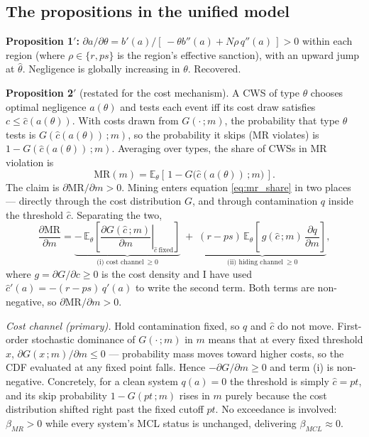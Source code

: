 \documentclass{article}
\begin{document}
\subsection{The propositions in the unified model}

\textbf{Proposition 1$'$:} $\partial a/\partial\theta = b'(a) / [\,-\theta b''(a) + N\rho\, q''(a)\,] > 0$ within each region (where $\rho \in \{r, ps\}$ is the region's effective sanction), with an upward jump at $\hat{\theta}$. Negligence is globally increasing in $\theta$. Recovered.

\textbf{Proposition 2$'$} (restated for the cost mechanism). A CWS of type $\theta$ chooses optimal negligence $a(\theta)$ and tests each event iff its cost draw satisfies $c \le \hat{c}(a(\theta))$. With costs drawn from $G(\cdot\,;m)$, the probability that type $\theta$ tests is $G(\hat{c}(a(\theta))\,;m)$, so the probability it skips (MR violates) is $1 - G(\hat{c}(a(\theta))\,;m)$. Averaging over types, the share of CWSs in MR violation is
\begin{equation}\label{eq:mr_share}
\text{MR}(m) = \mathbb{E}_\theta\!\left[\, 1 - G\!\big(\hat{c}(a(\theta))\,;m\big) \,\right].
\end{equation}
The claim is $\partial \text{MR}/\partial m > 0$. Mining enters equation \ref{eq:mr_share} in two places --- directly through the cost distribution $G$, and through contamination $q$ inside the threshold $\hat{c}$. Separating the two,
\begin{equation}\label{eq:mr_deriv}
\frac{\partial \text{MR}}{\partial m} = \underbrace{-\,\mathbb{E}_\theta\!\left[\left.\frac{\partial G(\hat{c}\,;m)}{\partial m}\right|_{\hat{c}\ \text{fixed}}\right]}_{\text{(i) cost channel}\ \ge 0} \;+\; \underbrace{(r-ps)\,\mathbb{E}_\theta\!\left[\, g(\hat{c}\,;m)\,\frac{\partial q}{\partial m}\right]}_{\text{(ii) hiding channel}\ \ge 0},
\end{equation}
where $g = \partial G/\partial c \ge 0$ is the cost density and I have used $\hat{c}'(a) = -(r-ps)\,q'(a)$ to write the second term. Both terms are non-negative, so $\partial \text{MR}/\partial m > 0$.

\emph{Cost channel (primary).} Hold contamination fixed, so $q$ and $\hat{c}$ do not move. First-order stochastic dominance of $G(\cdot\,;m)$ in $m$ means that at every fixed threshold $x$, $\partial G(x\,;m)/\partial m \le 0$ --- probability mass moves toward higher costs, so the CDF evaluated at any fixed point falls. Hence $-\partial G/\partial m \ge 0$ and term (i) is non-negative. Concretely, for a clean system $q(a)=0$ the threshold is simply $\hat{c}=pt$, and its skip probability $1 - G(pt\,;m)$ rises in $m$ purely because the cost distribution shifted right past the fixed cutoff $pt$. No exceedance is involved: $\beta_{MR}>0$ while every system's MCL status is unchanged, delivering $\beta_{MCL}\approx 0$.
\end{document}
